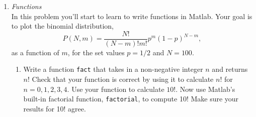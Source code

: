 \documentclass[12pt]{article}
\begin{document}
\begin{enumerate}
Your code below should be saved in and run from a script file.
\begin{enumerate}
\item Create an array in Matlab for the variable $p$, called \verb+p+.   The first entry of the array, \verb+p(1)+, should have a value of 0.5, and the last entry should have a value of 1.  Please create \verb+p+ such that the entries of \verb+p+ are evenly spaced in increments of 0.01.
\item Using the \verb+p+ array from part (a), create arrays in Matlab for $S(p,1)$ and $S(p,3)$  Call these arrays  \verb+S1+ and  \verb+S3+, respectively.
\item In the upper left corner of your Matlab window, search the documentation for  \verb+plot+.  Click on the first search result, about 2-d line plots.  Read through a few of the examples.  Then modify these examples to plot  $S(p,1)$ and $S(p,3)$ versus $p$.  
\item Label the axes of the figure in part (c) -- find an example in the \verb+plot+ to modify accordingly.
\item Figure out how to add a legend to the bottom right corner of the figure -- again, search the documentation.
\end{enumerate}
\item \textit{Functions}\\
In this problem you'll start to learn to write functions in Matlab.  Your goal is to plot the binomial distribution,
\begin{equation}\label{binom}
P(N, m) = \frac{N!}{(N - m)! m!} p^m (1 - p)^{N - m},
\end{equation}
as a function of $m$, for the set values $p = 1/2$ and $N = 100$.  \\
%
\begin{enumerate}
\item Write a function  \verb+fact+ that takes in a non-negative integer $n$ and returns $n!$  Check that your function is correct by using it to calculate $n!$ for $n = 0, 1, 2, 3, 4$.  Use your function to calculate $10!$.  Now use Matlab's built-in factorial function, \verb+factorial+, to compute 10!  Make sure your results for 10! agree.

\end{enumerate}
\end{enumerate}
\end{document}
